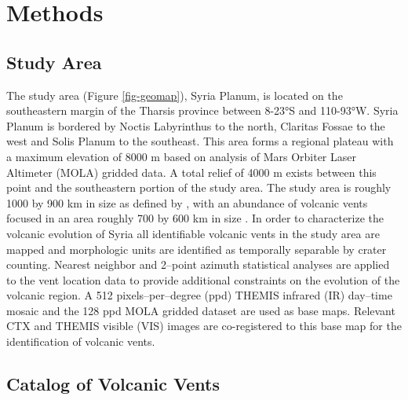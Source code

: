 \documentclass[preprint,review,authoryear,12pt]{elsarticle}
\begin{document}
\section{Methods}

\subsection{Study Area}

The study area (Figure \ref{fig-geomap}), Syria Planum, is located on the southeastern margin of the Tharsis province between 8-23°S and 110-93°W. Syria Planum is bordered by Noctis Labyrinthus to the north, Claritas Fossae to the west and Solis Planum to the southeast. This area forms a regional plateau with a maximum elevation of 8000 m based on analysis of Mars Orbiter Laser Altimeter (MOLA) \citep{Smith2003} gridded data. A total relief of 4000 m exists between this point and the southeastern portion of the study area. The study area is roughly 1000 by 900 km in size as defined by \citet{Scott1986}, with an abundance of volcanic vents focused in an area roughly 700 by 600 km in size \citep{Richardson2010,Richardson2012}. In order to characterize the volcanic evolution of Syria all identifiable volcanic vents in the study area are mapped and morphologic units are identified as temporally separable by crater counting. Nearest neighbor and 2--point azimuth statistical analyses are applied to the vent location data to provide additional constraints on the evolution of the volcanic region. A 512 pixels--per--degree (ppd) THEMIS infrared (IR) day--time mosaic \citep{Christensen2004} and the 128 ppd MOLA gridded dataset \citep{Smith2003} are used as base maps. Relevant CTX \citep{Malin2007} and THEMIS visible (VIS) \citep{Christensen2004} images are co-registered to this base map for the identification of volcanic vents.

\subsection{Catalog of Volcanic Vents}
\end{document}
